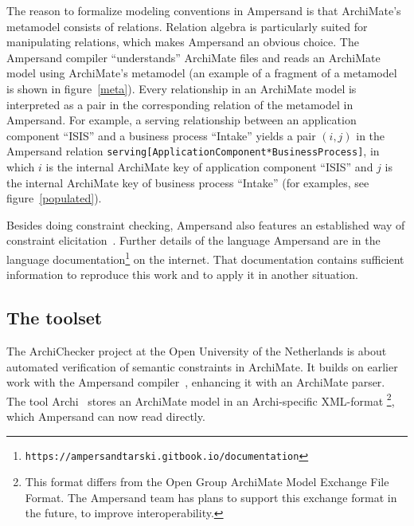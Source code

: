 \documentclass[sn-vancouver]{sn-jnl}%
\begin{document}
The reason to formalize modeling conventions in Ampersand is that ArchiMate's metamodel consists of relations.
Relation algebra is particularly suited for manipulating relations, which makes Ampersand an obvious choice.
The Ampersand compiler ``understands'' ArchiMate files and reads an ArchiMate model using ArchiMate's metamodel
(an example of a fragment of a metamodel is shown in figure~\ref{meta}).
Every relationship in an ArchiMate model is interpreted as a pair in the corresponding relation of the metamodel in Ampersand.
For example, a serving relationship between an application component ``ISIS'' and a business process ``Intake'' yields a pair
$(i,j)$ in the Ampersand relation {\small\tt serving[ApplicationComponent*BusinessProcess]},
in which $i$ is the internal ArchiMate key of application component ``ISIS'' and
$j$ is the internal ArchiMate key of business process ``Intake'' (for examples, see figure~\ref{populated}).

Besides doing constraint checking, Ampersand also features an established way of constraint elicitation~\cite{wedemeijer2014relation}.
Further details of the language Ampersand are in the language documentation\footnote{\tt\tiny https://ampersandtarski.gitbook.io/documentation} on the internet.
That documentation contains sufficient information to reproduce this work and to apply it in another situation.

\subsection{The toolset}\label{technical}
The ArchiChecker project at the Open University of the Netherlands is about automated verification of semantic constraints in ArchiMate.
It builds on earlier work with the Ampersand compiler~\cite{joosten2018relation},
enhancing it with an ArchiMate parser\cite{filetenterprise}.
The tool Archi~\cite{Archi} stores an ArchiMate model in an Archi-specific XML-format%
\footnote{This format differs from the Open Group ArchiMate Model Exchange File Format.
The Ampersand team has plans to support this exchange format in the future, to improve interoperability.},
which Ampersand can now read directly.
\end{document}
